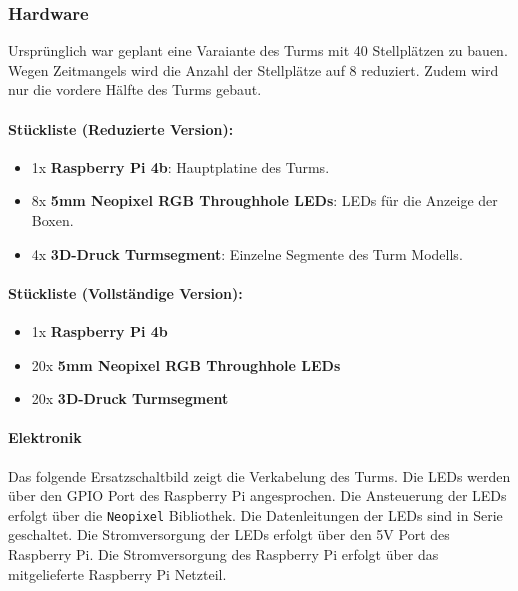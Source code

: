 \subsubsection{Hardware}

Ursprünglich war geplant eine Varaiante des Turms mit 40 Stellplätzen zu bauen. Wegen Zeitmangels wird die Anzahl der Stellplätze auf 8 reduziert. Zudem wird nur die vordere Hälfte des Turms gebaut.

\paragraph{Stückliste (Reduzierte Version):}
\begin{itemize}
  \item 1x \textbf{Raspberry Pi 4b}: Hauptplatine des Turms.
  \item 8x \textbf{5mm Neopixel RGB Throughhole LEDs}: LEDs für die Anzeige der Boxen.
  \item 4x \textbf{3D-Druck Turmsegment}: Einzelne Segmente des Turm Modells.
\end{itemize}

\paragraph{Stückliste (Vollständige Version):}
\begin{itemize}
  \item 1x \textbf{Raspberry Pi 4b}
  \item 20x \textbf{5mm Neopixel RGB Throughhole LEDs}
  \item 20x \textbf{3D-Druck Turmsegment}
\end{itemize}

\clearpage

\paragraph{Elektronik}

Das folgende Ersatzschaltbild zeigt die Verkabelung des Turms. Die LEDs werden über den GPIO Port des Raspberry Pi angesprochen. Die Ansteuerung der LEDs erfolgt über die \texttt{Neopixel} Bibliothek. Die Datenleitungen der LEDs sind in Serie geschaltet. Die Stromversorgung der LEDs erfolgt über den 5V Port des Raspberry Pi. Die Stromversorgung des Raspberry Pi erfolgt über das mitgelieferte Raspberry Pi Netzteil.

